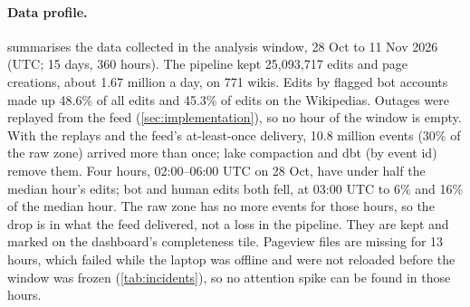 \paragraph{Data profile.}  summarises the data collected in the analysis window, 28 Oct
to 11 Nov 2026 (UTC; 15 days, 360 hours). The pipeline kept 25{,}093{,}717 edits and page creations, about
1.67 million a day, on 771 wikis. Edits by flagged bot accounts made up 48.6\% of all edits
and 45.3\% of edits on the Wikipedias. Outages were replayed from the feed
(\cref{sec:implementation}), so no hour of the window is empty. With the replays and the feed's at-least-once delivery, 10.8 million
events (30\% of the raw zone) arrived more than once; lake compaction and dbt (by event id) remove them. Four hours, 02:00--06:00 UTC on 28 Oct, have under half the median
hour's edits; bot and human edits both fell, at 03:00 UTC to 6\% and 16\% of the median hour. The raw
zone has no more events for those hours, so the drop is in what the feed delivered, not a loss in the
pipeline.
They are kept and marked on the dashboard's completeness tile. Pageview files are missing for 13 hours,
which failed while the laptop was offline and were not reloaded before the window was frozen
(\cref{tab:incidents}), so no attention spike can be found in those hours.
